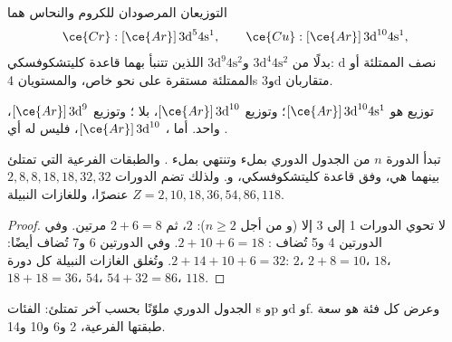 \begin{proposition}\label{prop:b1:quantum-numbers:exceptions}
التوزيعان المرصودان  للكروم والنحاس هما
\[
  \ce{Cr}: [\ce{Ar}]\,3\text{d}^5 4\text{s}^1, \qquad
  \ce{Cu}: [\ce{Ar}]\,3\text{d}^{10} 4\text{s}^1 ,
\]
بدلًا من $3\text{d}^4 4\text{s}^2$ و$3\text{d}^9 4\text{s}^2$
اللذين تتنبأ بهما قاعدة كليتشكوفسكي:  d نصف الممتلئة أو
الممتلئة مستقرة على نحو خاص، والمستويان 4s و3d متقاربان.
\end{proposition}

\begin{example}\label{ex:b1:quantum-numbers:copper}
توزيع  هو $[\ce{Ar}]\,3\text{d}^{10} 4\text{s}^1$؛ وتوزيع 
$[\ce{Ar}]\,3\text{d}^{10}$، بلا ؛ وتوزيع 
$[\ce{Ar}]\,3\text{d}^9$،  واحد. أما ، $[\ce{Ar}]\,3\text{d}^{10}$،
فليس له أي .
\end{example}

\begin{proposition}\label{prop:b1:quantum-numbers:table}
تبدأ الدورة $n$ من الجدول الدوري بملء  وتنتهي
بملء . والطبقات الفرعية التي تمتلئ بينهما هي، وفق
قاعدة كليتشكوفسكي،  و. ولذلك تضم الدورات
$2, 8, 8, 18, 18, 32, 32$ عنصرًا، وللغازات النبيلة $Z = 2, 10,
18, 36, 54, 86, 118$.
\end{proposition}

\begin{proof}
لا تحوي الدورات 1 إلى 3 إلا  (و من أجل $n \ge 2$): $2$، ثم
$2 + 6 = 8$ مرتين. وفي الدورتين 4 و5 تُضاف : $2 + 10 + 6 =
18$. وفي الدورتين 6 و7 تُضاف  أيضًا: $2 + 14 + 10 + 6 = 32$. وتُغلق
الغازات النبيلة كل دورة: $2$، $2 + 8 = 10$، $18$، $18 + 18 = 36$،
$54$، $54 + 32 = 86$، $118$.
\end{proof}

\begin{omfigure}
\omperiodictable[colour=blocks, legend]

{\small الجدول الدوري ملوّنًا بحسب آخر  تمتلئ:
الفئات s وp وd وf. وعرض كل فئة هو سعة طبقتها
الفرعية، 2 و6 و10 و14.}
\end{omfigure}

